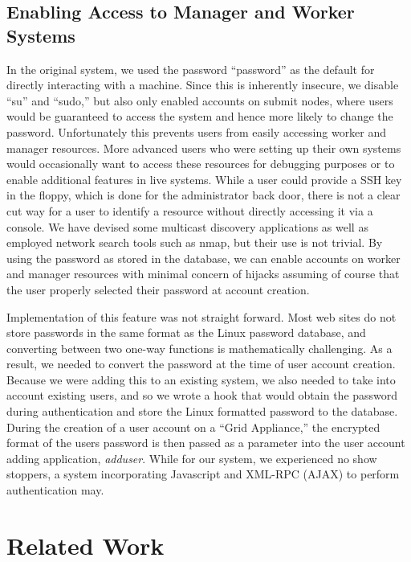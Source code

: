 \documentclass[twocolumn]{svjour3}
\begin{document}
\subsection{Enabling Access to Manager and Worker Systems}
 
In the original system, we used the password ``password'' as the default for
directly interacting with a machine.  Since this is inherently insecure, we
disable ``su'' and ``sudo,'' but also only enabled accounts on submit nodes,
where users would be guaranteed to access the system and hence more likely to
change the password.  Unfortunately this prevents users from easily accessing
worker and manager resources.  More advanced users who were setting up their
own systems would occasionally want to access these resources for debugging
purposes or to enable additional features in live systems.  While a user could
provide a SSH key in the floppy, which is done for the administrator back door,
there is not a clear cut way for a user to identify a resource without directly
accessing it via a console.  We have devised some multicast discovery
applications as well as employed network search tools such as nmap, but their
use is not trivial.  By using the password as stored in the database, we can
enable accounts on worker and manager resources with minimal concern of hijacks
assuming of course that the user properly selected their password at account
creation.

Implementation of this feature was not straight forward.  Most web sites do not
store passwords in the same format as the Linux password database, and
converting between two one-way functions is mathematically challenging.  As a
result, we needed to convert the password at the time of user account creation.
Because we were adding this to an existing system, we also needed to take into
account existing users, and so we wrote a hook that would obtain the password
during authentication and store the Linux formatted password to the database.
During the creation of a user account on a ``Grid Appliance,'' the encrypted
format of the users password is then passed as a parameter into the user
account adding application, {\em adduser}.  While for our system, we
experienced no show stoppers, a system incorporating Javascript and XML-RPC
(AJAX) to perform authentication may.

\section{Related Work}
\label{related_work}
\end{document}
